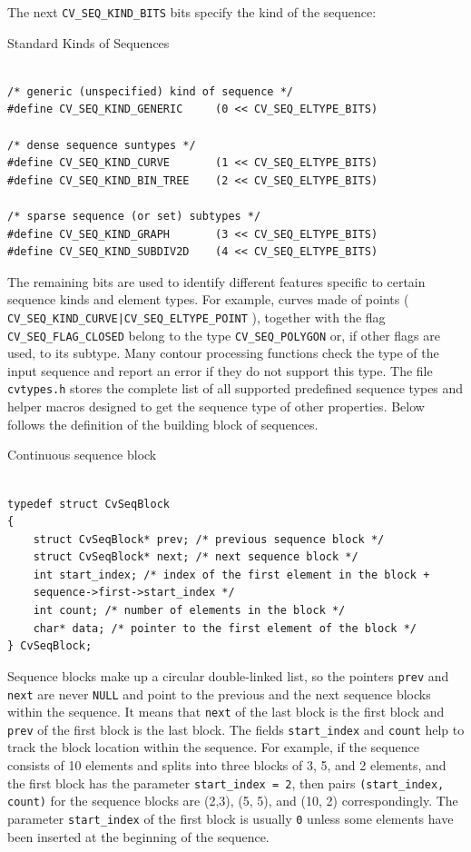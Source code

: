 The next \texttt{CV\_SEQ\_KIND\_BITS} bits specify the kind of the sequence:

Standard Kinds of Sequences

\begin{lstlisting}

/* generic (unspecified) kind of sequence */
#define CV_SEQ_KIND_GENERIC     (0 << CV_SEQ_ELTYPE_BITS)

/* dense sequence suntypes */
#define CV_SEQ_KIND_CURVE       (1 << CV_SEQ_ELTYPE_BITS)
#define CV_SEQ_KIND_BIN_TREE    (2 << CV_SEQ_ELTYPE_BITS)

/* sparse sequence (or set) subtypes */
#define CV_SEQ_KIND_GRAPH       (3 << CV_SEQ_ELTYPE_BITS)
#define CV_SEQ_KIND_SUBDIV2D    (4 << CV_SEQ_ELTYPE_BITS)

\end{lstlisting}

The remaining bits are used to identify different features specific
to certain sequence kinds and element types. For example, curves
made of points ( \texttt{CV\_SEQ\_KIND\_CURVE|CV\_SEQ\_ELTYPE\_POINT} ),
together with the flag \texttt{CV\_SEQ\_FLAG\_CLOSED} belong to the
type \texttt{CV\_SEQ\_POLYGON} or, if other flags are used, to its
subtype. Many contour processing functions check the type of the input
sequence and report an error if they do not support this type. The
file \texttt{cvtypes.h} stores the complete list of all supported
predefined sequence types and helper macros designed to get the sequence
type of other properties. Below follows the definition of the building
block of sequences.

\label{CvSeqBlock}

Continuous sequence block

\begin{lstlisting}

typedef struct CvSeqBlock
{
    struct CvSeqBlock* prev; /* previous sequence block */
    struct CvSeqBlock* next; /* next sequence block */
    int start_index; /* index of the first element in the block +
    sequence->first->start_index */
    int count; /* number of elements in the block */
    char* data; /* pointer to the first element of the block */
} CvSeqBlock;

\end{lstlisting}

Sequence blocks make up a circular double-linked list, so the pointers
\texttt{prev} and \texttt{next} are never \texttt{NULL} and point to the
previous and the next sequence blocks within the sequence. It means that
\texttt{next} of the last block is the first block and \texttt{prev} of
the first block is the last block. The fields \texttt{start\_index} and
\texttt{count} help to track the block location within the sequence. For
example, if the sequence consists of 10 elements and splits into three
blocks of 3, 5, and 2 elements, and the first block has the parameter
\texttt{start\_index = 2}, then pairs \texttt{(start\_index, count)} for the sequence
blocks are
(2,3), (5, 5), and (10, 2)
correspondingly. The parameter
\texttt{start\_index} of the first block is usually \texttt{0} unless
some elements have been inserted at the beginning of the sequence.

